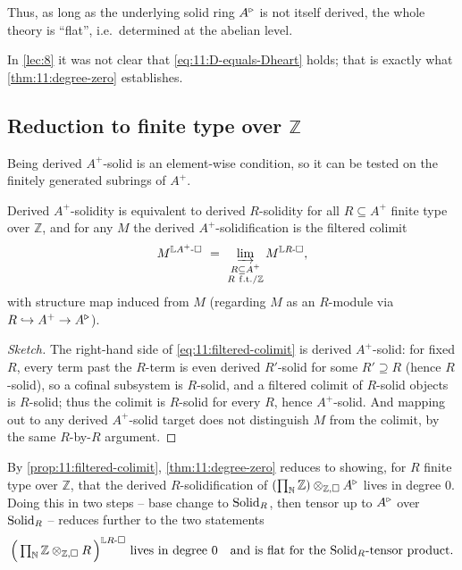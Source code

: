 Thus, as long as the underlying solid ring $A^{\triangleright}$ is not itself derived, the
whole theory is ``flat'', i.e.\ determined at the abelian level.

\begin{remark}
\label{rmk:11:settled}
In \cref{lec:8} it was not clear that \eqref{eq:11:D-equals-Dheart} holds; that
is exactly what \cref{thm:11:degree-zero} establishes.
\end{remark}

\subsection{Reduction to finite type over \texorpdfstring{$\mathbb{Z}$}{Z}}

Being derived $A^{+}$-solid is an element-wise condition, so it can be tested
on the finitely generated subrings of $A^{+}$.

\begin{proposition}
\label{prop:11:filtered-colimit}
Derived $A^{+}$-solidity is equivalent to derived $R$-solidity for all
$R\subseteq A^{+}$ finite type over $\mathbb{Z}$, and for any $M$ the derived
$A^{+}$-solidification is the filtered colimit
\begin{equation}
\label{eq:11:filtered-colimit}
M^{\mathbb{L}A^{+}\text{-}\square}\ =\ \varinjlim_{\substack{R\subseteq A^{+}\\
R\ \mathrm{f.t.}/\mathbb{Z}}} M^{\mathbb{L}R\text{-}\square},
\end{equation}
with structure map induced from $M$ (regarding $M$ as an $R$-module via
$R\hookrightarrow A^{+}\to A^{\triangleright}$).
\end{proposition}

\begin{proof}[Sketch]
The right-hand side of \eqref{eq:11:filtered-colimit} is derived
$A^{+}$-solid: for fixed $R$, every term past the $R$-term is even derived
$R'$-solid for some $R'\supseteq R$ (hence $R$-solid), so a cofinal subsystem
is $R$-solid, and a filtered colimit of $R$-solid objects is $R$-solid; thus
the colimit is $R$-solid for every $R$, hence $A^{+}$-solid. And mapping out to
any derived $A^{+}$-solid target does not distinguish $M$ from the colimit, by
the same $R$-by-$R$ argument.
\end{proof}

By \cref{prop:11:filtered-colimit}, \cref{thm:11:degree-zero} reduces to
showing, for $R$ finite type over $\mathbb{Z}$, that the derived
$R$-solidification of $(\prod_{\mathbb{N}}\mathbb{Z})\otimes_{\mathbb{Z},\square}
A^{\triangleright}$ lives in degree $0$. Doing this in two steps -- base change to
$\mathrm{Solid}_{R}$, then tensor up to $A^{\triangleright}$ over $\mathrm{Solid}_{R}$ -- reduces further
to the two statements
\begin{equation}
\label{eq:11:two-statements}
\Bigl(\,\textstyle\prod_{\mathbb{N}}\mathbb{Z}\otimes_{\mathbb{Z},\square}R\,
\Bigr)^{\mathbb{L}R\text{-}\square}\ \text{lives in degree }0
\quad\text{and is flat for the }\mathrm{Solid}_{R}\text{-tensor product.}
\end{equation}

